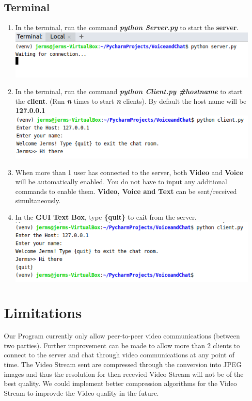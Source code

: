 \documentclass[a4paper,11pt]{article}
\begin{document}
\subsection{Terminal}
\begin{enumerate}
  \item In the terminal, run the command \textbf{\textit{python Server.py}} to start the \textbf{server}.
  \newline
  \includegraphics{server}
  \item In the terminal, run the command \textbf{\textit{python Client.py \#hostname }}to start the \textbf{client}. (Run \textit{\textbf{n}} times to start \textit{\textbf{n}} clients). By default the host name will be \textbf{127.0.0.1}
  \newline
  \includegraphics{client}
   \item When more than 1 user has connected to the server, both \textbf{Video} and \textbf{Voice} will be automatically enabled. You do not have to input any additional commands to enable them. \textbf{Video, Voice and Text} can be sent/received simultaneously.
   \item In the \textbf{GUI Text Box}, type \textbf{\{quit\}} to exit from the server.
   \newline
   \includegraphics{exit}
\end{enumerate}

\section{Limitations}
Our Program currently only allow peer-to-peer video communications (between two parties).  Further improvement can be made to allow more than 2 clients to connect to the server and chat through video communications at any point of time. The Video Stream sent are compressed through the conversion into JPEG images and thus the resolution for then recevied Video Stream will not be of the best quality. We could implement better compression algorithms for the Video Stream to improvde the Video quality in the future.
\end{document}
